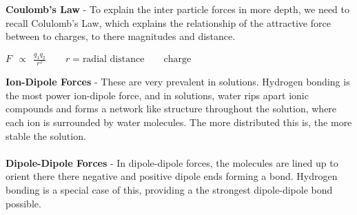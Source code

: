 \documentclass{article}
\begin{document}
\pagebreak

\noindent\textbf{Coulomb's Law} - To explain the inter particle forces in more depth, we need to recall Colulomb's Law, which explains the relationship of the attractive force between to charges, to there magnitudes and distance.
\begin{qq}

	\begin{center}
		$F \:\: \propto \:\: \frac{q_1q_2}{r^2} \qquad r=\text{radial distance}\qquad \text{charge}$
	\end{center}

\end{qq}
\vspace{10pt}

\noindent\textbf{Ion-Dipole Forces} - These are very prevalent in solutions. Hydrogen bonding is the most power ion-dipole force, and in solutions, water rips apart ionic compounds and forms a network like structure throughout the solution, where each ion is surrounded by water molecules. The more distributed this is, the more stable the solution.\\
\\
\textbf{Dipole-Dipole Forces} - In dipole-dipole forces, the molecules are lined up to orient there there negative and positive dipole ends forming a bond. Hydrogen bonding is a special case of this, providing a the strongest dipole-dipole bond possible.\\
\end{document}
